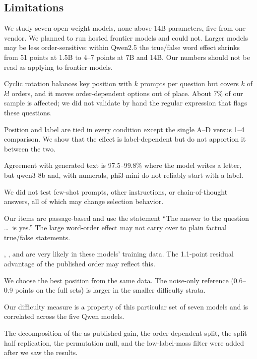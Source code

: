 \subsection{Limitations}
\label{sec:limitations}

We study seven open-weight models, none above 14B parameters, five from one vendor.
We planned to run hosted frontier models and could not.
Larger models may be less order-sensitive: within Qwen2.5 the true/false word effect shrinks from 51 points at 1.5B to 4--7 points at 7B and 14B.
Our numbers should not be read as applying to frontier models.

Cyclic rotation balances key position with $k$ prompts per question but covers $k$ of $k!$ orders, and it moves order-dependent options out of place.
About 7\% of our \mmlu sample is affected; we did not validate by hand the regular expression that flags these questions.

Position and label are tied in every condition except the single A--D versus 1--4 comparison.
We show that the effect is label-dependent but do not apportion it between the two.

Agreement with generated text is 97.5--99.8\% where the model writes a letter, but qwen3-8b and, with numerals, phi3-mini do not reliably start with a label.

We did not test few-shot prompts, other instructions, or chain-of-thought answers, all of which may change selection behavior.

Our \boolq items are passage-based and use the statement ``The answer to the question \ldots\ is yes.''
The large word-order effect may not carry over to plain factual true/false statements.

\mmlu, \csqa, and \boolq are very likely in these models' training data.
The 1.1-point residual advantage of the published \mmlu order may reflect this.

We choose the best position from the same data.
The noise-only reference (0.6--0.9 points on the full sets) is larger in the smaller difficulty strata.

Our difficulty measure is a property of this particular set of seven models and is correlated across the five Qwen models.

The decomposition of the as-published gain, the order-dependent split, the split-half replication, the permutation null, and the low-label-mass filter were added after we saw the results.
